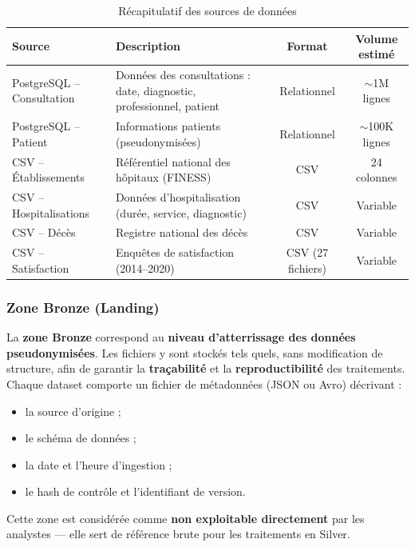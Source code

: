 \documentclass[12pt,a4paper]{article}
\begin{document}
\begin{table}[H]
\centering
\caption{Récapitulatif des sources de données}
\begin{tabularx}{\textwidth}{|l|X|c|c|}
\hline
\textbf{Source} & \textbf{Description} & \textbf{Format} & \textbf{Volume estimé} \\
\hline
PostgreSQL – Consultation & Données des consultations : date, diagnostic, professionnel, patient & Relationnel & $\sim$1M lignes \\
\hline
PostgreSQL – Patient & Informations patients (pseudonymisées) & Relationnel & $\sim$100K lignes \\
\hline
CSV – Établissements & Référentiel national des hôpitaux (FINESS) & CSV & 24 colonnes \\
\hline
CSV – Hospitalisations & Données d'hospitalisation (durée, service, diagnostic) & CSV & Variable \\
\hline
CSV – Décès & Registre national des décès & CSV & Variable \\
\hline
CSV – Satisfaction & Enquêtes de satisfaction (2014–2020) & CSV (27 fichiers) & Variable \\
\hline
\end{tabularx}
\end{table}

\subsubsection{Zone Bronze (Landing)}

La \textbf{zone Bronze} correspond au \textbf{niveau d'atterrissage des données pseudonymisées}.
Les fichiers y sont stockés tels quels, sans modification de structure, afin de garantir la \textbf{traçabilité} et la \textbf{reproductibilité} des traitements.
Chaque dataset comporte un fichier de métadonnées (JSON ou Avro) décrivant :

\begin{itemize}[leftmargin=*]
    \item la source d'origine ;
    \item le schéma de données ;
    \item la date et l'heure d'ingestion ;
    \item le hash de contrôle et l'identifiant de version.
\end{itemize}

Cette zone est considérée comme \textbf{non exploitable directement} par les analystes — elle sert de référence brute pour les traitements en Silver.
\end{document}
